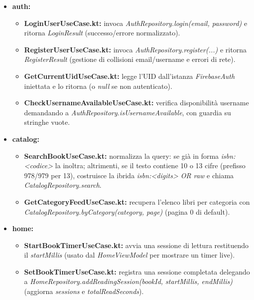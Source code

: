 \documentclass{article}
\begin{document}
\begin{itemize}
  \item \textbf{auth:}
  \begin{itemize}
    \item \textbf{LoginUserUseCase.kt:} invoca \textit{AuthRepository.login(email, password)} e ritorna \textit{LoginResult} (successo/errore normalizzato).
    \item \textbf{RegisterUserUseCase.kt:} invoca \textit{AuthRepository.register(...)} e ritorna \textit{RegisterResult} (gestione di collisioni email/username e errori di rete).
    \item \textbf{GetCurrentUidUseCase.kt:} legge l’UID dall’istanza \textit{FirebaseAuth} iniettata e lo ritorna (o \textit{null} se non autenticato).
    \item \textbf{CheckUsernameAvailableUseCase.kt:} verifica disponibilità username demandando a \textit{AuthRepository.isUsernameAvailable}, con guardia su stringhe vuote.
  \end{itemize}

  \item \textbf{catalog:}
  \begin{itemize}
    \item \textbf{SearchBookUseCase.kt:} normalizza la query: se già in forma \textit{isbn:\textless{}codice\textgreater{}} la inoltra; altrimenti, se il testo contiene 10 o 13 cifre (prefisso 978/979 per 13), costruisce la ibrida \textit{isbn:\textless{}digits\textgreater{} OR raw} e chiama \textit{CatalogRepository.search}.
    \item \textbf{GetCategoryFeedUseCase.kt:} recupera l’elenco libri per categoria con \textit{CatalogRepository.byCategory(category, page)} (pagina 0 di default).
  \end{itemize}

  \item \textbf{home:}
  \begin{itemize}
    \item \textbf{StartBookTimerUseCase.kt:} avvia una sessione di lettura restituendo il \textit{startMillis} (usato dal \textit{HomeViewModel} per mostrare un timer live).
    \item \textbf{SetBookTimerUseCase.kt:} registra una sessione completata delegando a \textit{HomeRepository.addReadingSession(bookId, startMillis, endMillis)} (aggiorna \textit{sessions} e \textit{totalReadSeconds}).
  \end{itemize}


\end{itemize}
\end{document}
